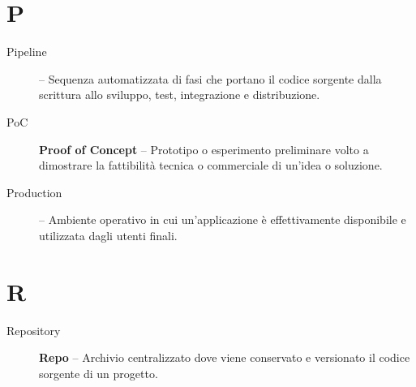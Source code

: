 \section*{P}
\begin{description}
    \item[Pipeline] -- Sequenza automatizzata di fasi che portano il codice sorgente dalla scrittura allo sviluppo, test, integrazione e distribuzione.
    \item[PoC] \textbf{Proof of Concept} -- Prototipo o esperimento preliminare volto a dimostrare la fattibilità tecnica o commerciale di un’idea o soluzione.
    \item[Production] -- Ambiente operativo in cui un’applicazione è effettivamente disponibile e utilizzata dagli utenti finali.
\end{description}

\section*{R}
\begin{description}
    \item[Repository] \textbf{Repo} -- Archivio centralizzato dove viene conservato e versionato il codice sorgente di un progetto.
\end{description}

